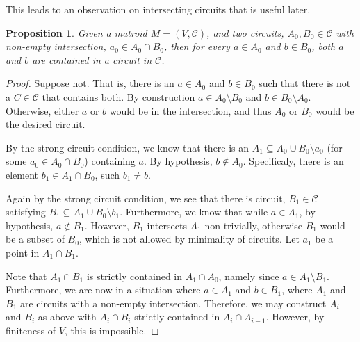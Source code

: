 \documentclass[11pt]{article}
\newcommand{\sC}{\mathscr{C}}
\newtheorem{prop}[thm]{Proposition}
\theoremstyle{remark}
\theoremstyle{definition}
\begin{document}
This leads to an observation on intersecting circuits that is useful later.

\begin{prop}\label{res:2-complete}
	Given a matroid $M = (V, \sC)$, and two circuits, $A_0, B_0 \in \sC$ with non-empty intersection, $a_0 \in A_0 \cap B_0$, then for every $a \in A_0$ and $b \in B_0$, both $a$ and $b$ are contained in a circuit in $\sC$.
\end{prop}
\begin{proof}
	Suppose not. That is, there is an $a \in A_0$ and $b \in B_0$ such that there is not a $C \in \sC$ that contains both. By construction $a \in A_0 \setminus B_0$ and $b \in B_0 \setminus A_0$. Otherwise, either $a$ or $b$ would be in the intersection, and thus $A_0$ or $B_0$ would be the desired circuit.
	
	By the strong circuit condition, we know that there is an $A_1 \subseteq A_0 \cup B_0 \setminus a_0$ (for some $a_0 \in A_0 \cap B_0$) containing $a$. By hypothesis, $b \not \in A_0$. Specificaly, there is an element $b_1 \in A_1 \cap B_0$, such $b_1 \neq b$. 
	
	Again by the strong circuit condition, we see that there is circuit, $B_1 \in \sC$ satisfying $B_1 \subseteq A_1 \cup B_0 \setminus b_1$. Furthermore, we know that while $a \in A_1$, by hypothesis, $a \not \in B_1$. However, $B_1$ intersects $A_1$ non-trivially, otherwise $B_1$ would be a subset of $B_0$, which is not allowed by minimality of circuits. Let $a_1$ be a point in $A_1 \cap B_1$. 
	
	Note that $A_1 \cap B_1$ is strictly contained in $A_1 \cap A_0$, namely since $a \in A_1 \setminus B_1$. Furthermore, we are now in a situation where $a \in A_1$ and $b \in B_1$, where $A_1$ and $B_1$ are circuits with a non-empty intersection. Therefore, we may construct $A_i$ and $B_i$ as above with $A_i \cap B_i$ strictly contained in $A_i \cap A_{i-1}$. However, by finiteness of $V$, this is impossible.
\end{proof}
\end{document}
